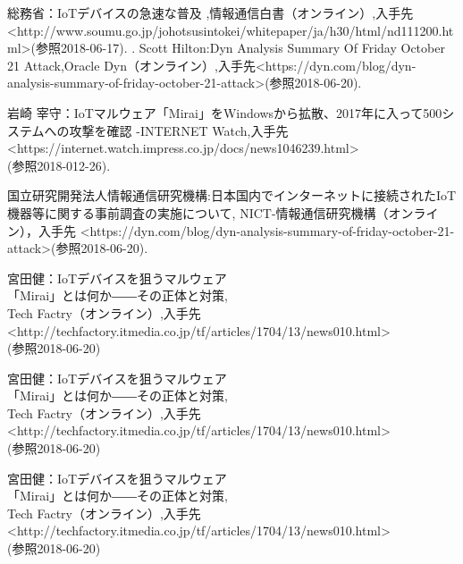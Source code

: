 
\begin{thebibliography}{30}
		総務省：IoTデバイスの急速な普及 ,情報通信白書（オンライン）,入手先\textless http://www.soumu.go.jp/johotsusintokei/whitepaper/ja/h30/html/nd111200.html\textgreater(参照2018-06-17).
   .
       Scott Hilton:Dyn Analysis Summary Of Friday October 21 Attack,Oracle Dyn（オンライン）,入手先\textless https:\slash\slash{}dyn.com\slash{}blog\slash{}dyn-analysis-summary-of-friday-october-21-attack\textgreater (参照2018-06-20).
    
       岩崎 宰守：IoTマルウェア「Mirai」をWindowsから拡散、2017年に入って500システムへの攻撃を確認 -INTERNET Watch,入手先\textless https:\slash\slash{}internet.watch.impress.co.jp\slash{}docs\slash{}news1046239.html\textgreater\\(参照2018-012-26).
    
        国立研究開発法人情報通信研究機構:日本国内でインターネットに接続されたIoT機器等に関する事前調査の実施について, NICT-情報通信研究機構（オンライン），入手先 \textless https:\slash\slash{}dyn.com\slash{}blog\slash{}dyn-analysis-summary-of-friday-october-21-
        attack\textgreater (参照2018-06-20).
        
        宮田健：IoTデバイスを狙うマルウェア\\「Mirai」とは何か――その正体と対策,\\Tech Factry（オンライン）,入手先\textless http:\slash\slash{}techfactory.itmedia.co.jp\slash{}tf\slash{}articles\slash{}1704\slash{}13\slash{}news010.html\textgreater\\(参照2018-06-20)

        宮田健：IoTデバイスを狙うマルウェア\\「Mirai」とは何か――その正体と対策,\\Tech Factry（オンライン）,入手先\textless http:\slash\slash{}techfactory.itmedia.co.jp\slash{}tf\slash{}articles\slash{}1704\slash{}13\slash{}news010.html\textgreater\\(参照2018-06-20)
    
        宮田健：IoTデバイスを狙うマルウェア\\「Mirai」とは何か――その正体と対策,\\Tech Factry（オンライン）,入手先\textless http:\slash\slash{}techfactory.itmedia.co.jp\slash{}tf\slash{}articles\slash{}1704\slash{}13\slash{}news010.html\textgreater\\(参照2018-06-20)


\end{thebibliography}
